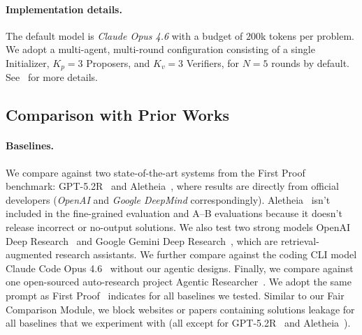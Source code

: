\documentclass{article}
\newcommand{\OpenAI}{\emph{OpenAI}\xspace}
\newcommand{\GoogleDeepMind}{\emph{Google DeepMind}\xspace}
\begin{document}
\vspace{-7pt}
\paragraph{Implementation details.} The default model is \emph{Claude Opus 4.6} with a budget of $200$k tokens per problem. We adopt a multi-agent, multi-round configuration consisting of a single Initializer, $K_p = 3$ Proposers, and $K_v = 3$ Verifiers, for $N = 5$ rounds by default. See~ for more details.
\vspace{-7pt}
\subsection{Comparison with Prior Works}
\label{sec-compare-prior-works}
\vspace{-7pt}
\paragraph{Baselines.}
We compare against two state-of-the-art systems from the First Proof benchmark: GPT-5.2R~\citep{openai_first_proof_2025} and Aletheia~\citep{aletheia}, where results are directly from official developers (\OpenAI and \GoogleDeepMind correspondingly). Aletheia~\citep{aletheia} isn't included in the fine-grained evaluation and A--B evaluations because it doesn't release incorrect or no-output solutions. We also test two strong models OpenAI Deep Research~\citep{openai_deep_research_2025} and Google Gemini Deep Research~\citep{google_gemini_deep_research_2025}, which are retrieval-augmented research assistants. We further compare against the coding CLI model Claude Code Opus 4.6~\citep{anthropic_claude_code} without our agentic designs. Finally, we compare against one open-sourced auto-research project Agentic Researcher~\citep{zimmer2026agenticresearcherpracticalguide}. We adopt the same prompt as First Proof~\citep{abouzaid2026first} indicates for all baselines we tested. Similar to our Fair Comparison Module, we block websites or papers containing solutions leakage for all baselines that we experiment with (all except for GPT-5.2R~\citep{openai_deep_research_2025} and Aletheia~\citep{aletheia}).

\vspace{-7pt}
\end{document}
